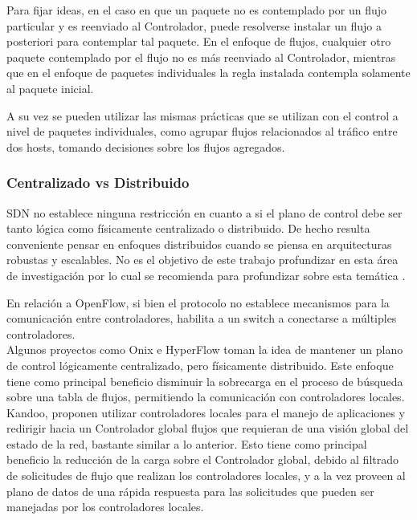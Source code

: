 Para fijar ideas, en el caso en que un paquete no es contemplado por un flujo particular y es reenviado al Controlador, puede resolverse instalar un flujo a posteriori para contemplar tal paquete. En el enfoque de flujos, cualquier otro paquete contemplado por el flujo no es m\'as reenviado al Controlador, mientras que en el enfoque de paquetes individuales la regla instalada contempla solamente al paquete inicial.

A su vez se pueden utilizar las mismas prácticas que se utilizan con el control a nivel
de paquetes individuales, como agrupar flujos relacionados al tráfico entre dos hosts, tomando
decisiones sobre los flujos agregados. 

\subsubsection{Centralizado vs Distribuido}
SDN no establece ninguna restricción en cuanto a si el plano de control debe ser tanto lógica como físicamente centralizado o distribuido. De hecho resulta conveniente pensar en enfoques distribuidos cuando se piensa en arquitecturas robustas y escalables. No es el objetivo de este trabajo profundizar en esta área de investigación por lo cual se recomienda para profundizar sobre esta temática \cite{heller2012controller}\cite{levin2012logically}. 

En relación a OpenFlow, si bien el protocolo no establece mecanismos para la comunicación entre controladores, habilita a un switch a conectarse a múltiples controladores.\\

Algunos proyectos como Onix\cite{koponen2014distributed} e HyperFlow\cite{tootoonchian2010hyperflow} toman la idea de mantener un plano de control lógicamente centralizado, pero físicamente distribuido. Este enfoque tiene como principal beneficio disminuir la sobrecarga en el proceso de búsqueda sobre una tabla de flujos, permitiendo la comunicación con controladores locales.\\

Kandoo\cite{hassas2012kandoo}, proponen utilizar controladores locales para el manejo de aplicaciones y redirigir hacia un Controlador global flujos que requieran de una visión global del estado de la red, bastante similar a lo anterior. Esto tiene como principal beneficio la reducción de la carga sobre el Controlador global, debido al filtrado de solicitudes de flujo que realizan los controladores locales, y a la vez proveen al plano de datos de una rápida respuesta para las solicitudes que pueden ser manejadas por los controladores locales.\\

